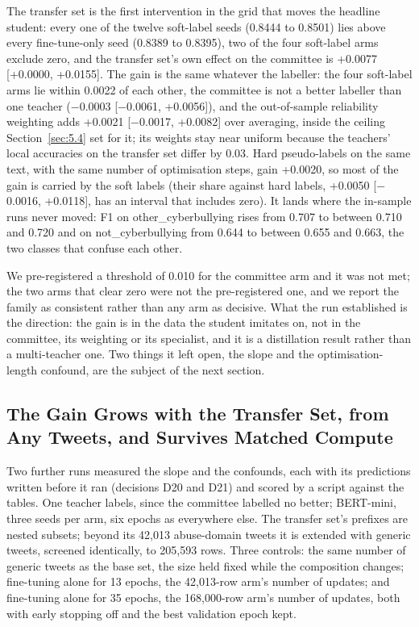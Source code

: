 The transfer set is the first intervention in the grid that moves the headline student: every one of
the twelve soft-label seeds (0.8444 to 0.8501) lies above every fine-tune-only seed (0.8389 to
0.8395), two of the four soft-label arms exclude zero, and the transfer set's own effect on the
committee is +0.0077 [+0.0000, +0.0155]. The gain is the same whatever the labeller: the four
soft-label arms lie within 0.0022 of each other, the committee is not a better labeller than one
teacher ($-$0.0003 [$-$0.0061, +0.0056]), and the out-of-sample reliability weighting adds +0.0021
[$-$0.0017, +0.0082] over averaging, inside the ceiling Section~\ref{sec:5.4} set for it; its
weights stay near uniform because the teachers' local accuracies on the transfer set differ by 0.03.
Hard pseudo-labels on the same text, with the same number of optimisation steps, gain +0.0020, so
most of the gain is carried by the soft labels (their share against hard labels, +0.0050 [$-$0.0016,
+0.0118], has an interval that includes zero). It lands where the in-sample runs never moved: F1 on
other\_cyberbullying rises from 0.707 to between 0.710 and 0.720 and on not\_cyberbullying from
0.644 to between 0.655 and 0.663, the two classes that confuse each other.

We pre-registered a threshold of 0.010 for the committee arm and it was not met; the two arms that
clear zero were not the pre-registered one, and we report the family as consistent rather than any
arm as decisive. What the run established is the direction: the gain is in the data the student
imitates on, not in the committee, its weighting or its specialist, and it is a distillation result
rather than a multi-teacher one. Two things it left open, the slope and the optimisation-length
confound, are the subject of the next section.
\subsection{The Gain Grows with the Transfer Set, from Any Tweets, and Survives Matched Compute}
\label{sec:5.8}
Two further runs measured the slope and the confounds, each with its predictions written before it
ran (decisions D20 and D21) and scored by a script against the tables. One teacher labels, since the
committee labelled no better; BERT-mini, three seeds per arm, six epochs as everywhere else. The
transfer set's prefixes are nested subsets; beyond its 42,013 abuse-domain tweets it is extended
with generic tweets, screened identically, to 205,593 rows. Three controls: the same number of
generic tweets as the base set, the size held fixed while the composition changes; fine-tuning alone
for 13 epochs, the 42,013-row arm's number of updates; and fine-tuning alone for 35 epochs, the
168,000-row arm's number of updates, both with early stopping off and the best validation epoch
kept.

